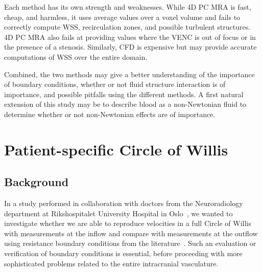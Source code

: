 Each method has its own strength and weaknesses. While 4D PC MRA is
fast, cheap, and harmless, it uses average values over a voxel volume
and fails to correctly compute WSS, recirculation zones, and possible
turbulent structures. 4D PC MRA also fails at providing values where
the VENC is out of focus or in the presence of a stenosis. Similarly,
CFD is expensive but may provide accurate computations of WSS over the
entire domain.

Combined, the two methods may give a better understanding of the
importance of boundary conditions, whether or not fluid structure
interaction is of importance, and possible pitfalls using the
different methods. A first natural extension of this study may be to
describe blood as a non-Newtonian fluid to determine whether or not
non-Newtonian effects are of importance.

\section{Patient-specific Circle of Willis} \label{cok}

\subsection{Background}

In a study performed in collaboration with doctors from the
Neuroradiology department at Rikshospitalet University Hospital in
Oslo~\cite{rh}, we wanted to investigate whether we are able to
reproduce velocities in a full Circle of Willis with measurements at
the inflow and compare with measurements at the outflow using
resistance boundary conditions from the literature~\cite{peiro,
  VignonClementel}. Such an evaluation or verification of boundary
conditions is essential, before proceeding with more sophisticated
problems related to the entire intracranial vasculature.


